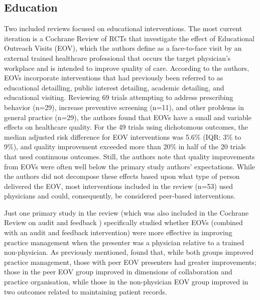 \documentclass[12pt]{article}
\begin{document}
\subsection{Education}

Two included reviews \citep{obrienEducationalOutreachVisits1997,obrienEducationalOutreachVisits2007} focused on educational interventions. The most current iteration \citep{obrienEducationalOutreachVisits2007} is a Cochrane Review of RCTs that investigate the effect of Educational Outreach Visits (EOV), which the authors define as a face-to-face visit by an external trained healthcare professional that occurs the target physician's workplace and is intended to improve quality of care. According to the authors, EOVs incorporate interventions that had previously been referred to as educational detailling, public interest detailing, academic detailing, and educational visiting. Reviewing 69 trials attempting to address prescribing behavior (n=29), increase preventive screening (n=11), and other problems in general practice (n=29), the authors found that EOVs have a small and variable effects on healthcare quality. For the 49 trials using dichotomous outcomes, the median adjusted risk difference for EOV interventions was 5.6\% (IQR: 3\% to 9\%), and quality improvement exceeded more than 20\% in half of the 20 trials that used continuous outcomes. Still, the authors note that quality improvements from EOVs were often well below the primary study authors' expectations. While the authors did not decompose these effects based upon what type of person delivered the EOV, most interventions included in the review (n=53) used physicians and could, consequently, be considered peer-based interventions.

Just one primary study in the review (which was also included in the Cochrane Review on audit and feedback \citep{jamtvedtAuditFeedbackEffects2006}) specifically studied whether EOVs (combined with an audit and feedback intervention) were more effective in improving practice management when the presenter was a physician relative to a trained non-physician. As previously mentioned, \citet{homberghPracticeVisitsTool1999} found that, while both groups improved practice management, those with peer EOV presenters had greater improvements; those in the peer EOV group improved in dimensions of collaboration and practice organisation, while those in the non-physician EOV group improved in two outcomes related to maintaining patient records.
\end{document}
